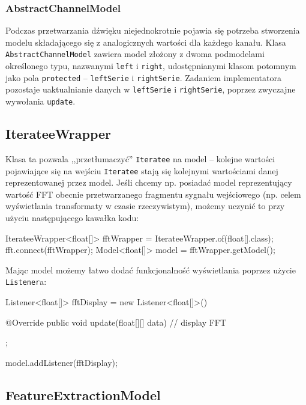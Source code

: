 \subsubsection{AbstractChannelModel}

Podczas przetwarzania dźwięku niejednokrotnie pojawia się potrzeba stworzenia modelu składającego
się z analogicznych wartości dla każdego kanału. Klasa \texttt{AbstractChannelModel} zawiera model
złożony z dwoma podmodelami określonego typu, nazwanymi \texttt{left} i \texttt{right},
udostępnianymi klasom potomnym jako pola \texttt{protected} -- \texttt{leftSerie} i
\texttt{rightSerie}. Zadaniem implementatora pozostaje uaktualnianie danych w \texttt{leftSerie} i
\texttt{rightSerie}, poprzez zwyczajne wywołania \texttt{update}.

\subsection{IterateeWrapper}

Klasa ta pozwala ,,przetłumaczyć'' \texttt{Iteratee} na model -- kolejne wartości pojawiające się na
wejściu \texttt{Iteratee} stają się kolejnymi wartościami danej reprezentowanej przez model. Jeśli
chcemy np. posiadać model reprezentujący wartość FFT obecnie przetwarzanego fragmentu sygnału
wejściowego (np. celem wyświetlania transformaty w czasie rzeczywistym), możemy uczynić to przy
użyciu następującego kawałka kodu:

\begin{java}
IterateeWrapper<float[]> fftWrapper = IterateeWrapper.of(float[].class);
fft.connect(fftWrapper);
Model<float[]> model = fftWrapper.getModel();
\end{java}

Mając model możemy łatwo dodać funkcjonalność wyświetlania poprzez użycie \texttt{Listener}a:

\begin{java}
Listener<float[]> fftDisplay = new Listener<float[]>() {

    @Override
    public void update(float[][] data) {
        // display FFT
    }
};

model.addListener(fftDisplay);
\end{java}

\subsection{FeatureExtractionModel}

